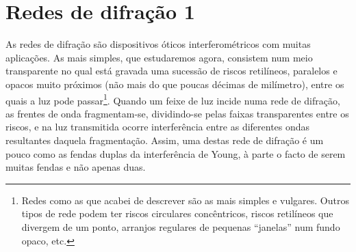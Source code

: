 \section{Redes de difração 1} 
As redes de difração são dispositivos óticos interferométricos com muitas
aplicações. As mais simples, que estudaremos agora, consistem num meio
transparente no qual está gravada uma sucessão de riscos retilíneos, paralelos
e opacos muito próximos (não mais do que poucas décimas de milímetro), entre os
quais a luz pode passar\footnote{Redes como as que acabei de descrever são as
  mais simples e vulgares. Outros tipos de rede podem ter riscos circulares
  concêntricos, riscos retilíneos que divergem de um ponto, arranjos regulares
  de pequenas ``janelas'' num fundo opaco, etc.}. Quando um feixe de luz incide
numa rede de difração, as frentes de onda fragmentam-se, dividindo-se pelas
faixas transparentes entre os riscos, e na luz transmitida ocorre interferência
entre as diferentes ondas resultantes daquela fragmentação.  Assim, uma destas
rede de difração é um pouco como as fendas duplas da interferência de Young, à
parte o facto de serem muitas fendas e não apenas duas. 

